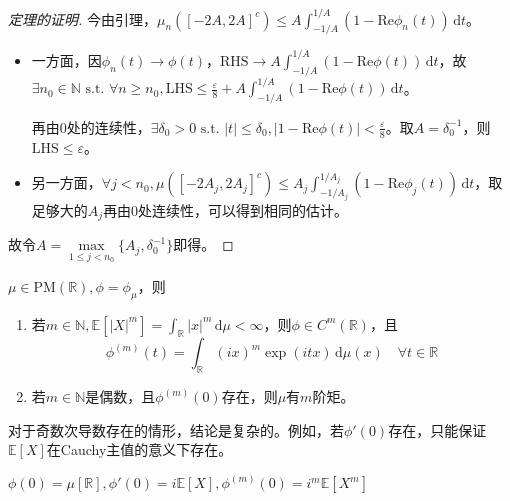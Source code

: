 \documentclass{ctexart}
\begin{document}
\begin{proof}[定理的证明]
今由引理，$\mu_n([-2A,2A]^c)\leq A \int_{-1/A}^{1/A} (1- \mathrm{Re}\phi_n(t)) \,\mathrm{d}t$。
\begin{itemize}
\item 一方面，因$\phi_n(t)\to \phi(t)$，$\mathrm{RHS}\to A \int_{-1/A}^{1/A} (1- \mathrm{Re}\phi(t)) \,\mathrm{d}t$，故$\exists n_0\in \mathbb{N} \text{ s.t. }\forall n\geq n_0,\mathrm{LHS}\leq \frac{\varepsilon}{8}+ A \int_{-1/A}^{1/A} (1- \mathrm{Re}\phi(t)) \,\mathrm{d}t$。

  再由$0$处的连续性，$\exists \delta_0 >0 \text{ s.t. } |t|\leq \delta_0, |1- \mathrm{Re}\phi(t)|< \frac{\varepsilon}{8}$。取$A=\delta_0^{-1}$，则$\mathrm{LHS}\leq \varepsilon$。 
\item 另一方面，$\forall j<n_0, \mu([-2A_j,2A_j]^c)\leq A_j \int_{-1/A_{j}}^{1/A_{j}} (1-\mathrm{Re}\phi_j(t)) \,\mathrm{d}t$，取足够大的$A_j$再由0处连续性，可以得到相同的估计。
\end{itemize}
故令$A=\max \limits_{1\leq j< n_0} \{A_{j}, \delta_0^{-1}\}$即得。
\end{proof}

\begin{Prop}[特征函数的进一步性质]
 $\mu\in \mathrm{PM}(\mathbb{R}), \phi=\phi_{\mu}$，则
\begin{enumerate}
\item 若$m\in \mathbb{N}, \mathbb{E}\left[ |X|^m \right]= \int_{\mathbb{R}}^{}|x|^m  \,\mathrm{d}\mu<\infty $，则$\phi\in C^m(\mathbb{R})$，且
  \begin{equation*}
\phi^{(m)}(t)=\int_{\mathbb{R}}^{} (ix)^m\exp(itx)  \,\mathrm{d}\mu(x) \quad \forall t\in \mathbb{R}
  \end{equation*}
\item 若$m\in \mathbb{N}$是偶数，且$\phi^{(m)}(0)$存在，则$\mu$有$m$阶矩。
\end{enumerate}
\end{Prop}

\begin{Rmk}
  对于奇数次导数存在的情形，结论是复杂的。例如，若$\phi'(0)$存在，只能保证$\mathbb{E}\left[ X \right] $在Cauchy主值的意义下存在。
\end{Rmk}

\begin{Rmk}
 $\phi(0)=\mu[\mathbb{R}], \phi'(0)=i \mathbb{E}\left[ X \right], \phi^{(m)}(0)=i^m \mathbb{E}\left[ X^m \right]  $
\end{Rmk}
\end{document}
